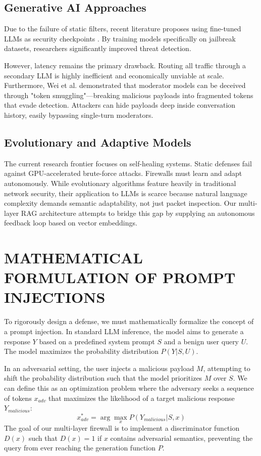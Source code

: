 \documentclass[10pt, conference]{IEEEtran}
\begin{document}
\subsection{Generative AI Approaches}
Due to the failure of static filters, recent literature proposes using fine-tuned LLMs as security checkpoints \cite{shen2023do}. By training models specifically on jailbreak datasets, researchers significantly improved threat detection. 

However, latency remains the primary drawback. Routing all traffic through a secondary LLM is highly inefficient and economically unviable at scale. Furthermore, Wei et al. \cite{wei2023jailbroken} demonstrated that moderator models can be deceived through "token smuggling"—breaking malicious payloads into fragmented tokens that evade detection. Attackers can hide payloads deep inside conversation history, easily bypassing single-turn moderators.

\subsection{Evolutionary and Adaptive Models}
The current research frontier focuses on self-healing systems. Static defenses fail against GPU-accelerated brute-force attacks. Firewalls must learn and adapt autonomously. While evolutionary algorithms feature heavily in traditional network security, their application to LLMs is scarce because natural language complexity demands semantic adaptability, not just packet inspection. Our multi-layer RAG architecture attempts to bridge this gap by supplying an autonomous feedback loop based on vector embeddings.

\section{MATHEMATICAL FORMULATION OF PROMPT INJECTIONS}
To rigorously design a defense, we must mathematically formalize the concept of a prompt injection. In standard LLM inference, the model aims to generate a response $Y$ based on a predefined system prompt $S$ and a benign user query $U$. The model maximizes the probability distribution $P(Y | S, U)$.

In an adversarial setting, the user injects a malicious payload $M$, attempting to shift the probability distribution such that the model prioritizes $M$ over $S$. We can define this as an optimization problem where the adversary seeks a sequence of tokens $x_{adv}$ that maximizes the likelihood of a target malicious response $Y_{malicious}$:
\begin{equation}
x_{adv}^* = \arg\max_{x} P(Y_{malicious} | S, x)
\end{equation}
The goal of our multi-layer firewall is to implement a discriminator function $D(x)$ such that $D(x) = 1$ if $x$ contains adversarial semantics, preventing the query from ever reaching the generation function $P$.
\end{document}
